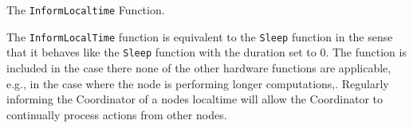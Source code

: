 \begin{algorithm}[ht]
    \DontPrintSemicolon
    
    
    \caption{The \texttt{InformLocaltime} Function.}
    \label{algo:hwfuncsupdatelocaltime}
\end{algorithm}

The \texttt{InformLocalTime} function is equivalent to the \texttt{Sleep} function in the sense that it behaves like the \texttt{Sleep} function with the duration set to 0. The function is included in the case there none of the other hardware functions are applicable, e.g., in the case where the node is performing longer computations,. Regularly informing the Coordinator of a nodes localtime will allow the Coordinator to continually process actions from other nodes.